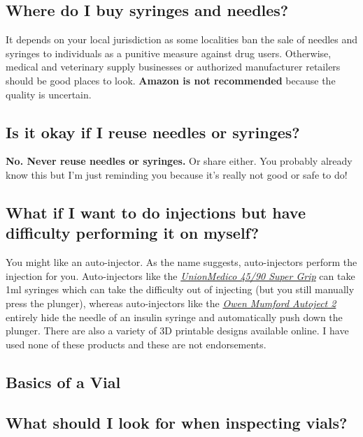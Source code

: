 \documentclass{article}
\begin{document}
\subsection{Where do I buy syringes and needles?}

It depends on your local jurisdiction as some localities ban the sale of needles and syringes to individuals as a punitive measure against drug users. Otherwise, medical and veterinary supply businesses or authorized manufacturer retailers should be good places to look. \textbf{Amazon is not recommended} because the quality is uncertain.

\subsection{Is it okay if I reuse needles or syringes?}

\textbf{No. Never reuse needles or syringes. }Or share either. You probably already know this but I’m just reminding you because it’s really not good or safe to do!

\subsection{What if I want to do injections but have difficulty performing it on myself?}\label{5-21}

You might like an auto-injector. As the name suggests, auto-injectors perform the injection for you. Auto-injectors like the \href{https://unionmedico.com/90-super-grip/}{\textit{UnionMedico 45/90 Super Grip}} can take 1ml syringes which can take the difficulty out of injecting (but you still manually press the plunger), whereas auto-injectors like the \href{https://www.owenmumford.com/us/medical-devices/autoject-2}{\textit{Owen Mumford Autoject 2}} entirely hide the needle of an insulin syringe and automatically push down the plunger. There are also a variety of 3D printable designs available online. I have used none of these products and these are not endorsements.

\subsection*{Basics of a Vial}

\subsection{What should I look for when inspecting vials?}
\end{document}
